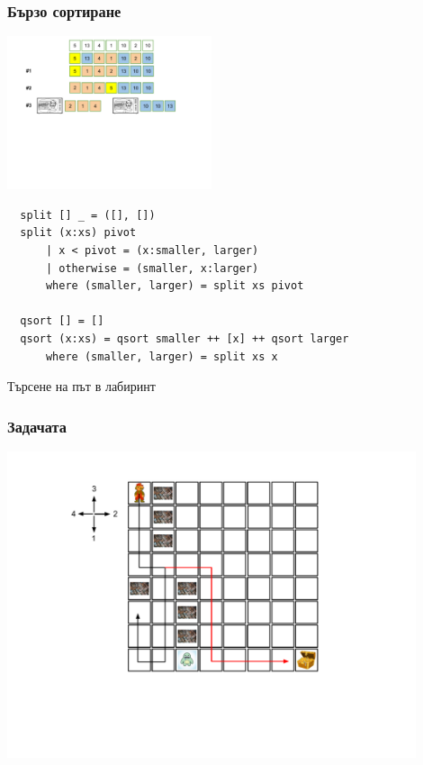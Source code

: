 \documentclass{beamer}
\begin{document}
\begin{frame}[fragile]
  \frametitle{Бързо сортиране}

  \begin{center}
    \includegraphics[width=6cm]{images/qsort}
 \end{center}
   
\vspace*{-2cm}

\begin{lstlisting}
  split [] _ = ([], [])
  split (x:xs) pivot 
      | x < pivot = (x:smaller, larger)
      | otherwise = (smaller, x:larger)
      where (smaller, larger) = split xs pivot
  
  qsort [] = []
  qsort (x:xs) = qsort smaller ++ [x] ++ qsort larger
      where (smaller, larger) = split xs x
  \end{lstlisting}
  

\end{frame}


\begin{frame}
  \centerline{Търсене на път в лабиринт}
\end{frame}



\begin{frame}[fragile]
  \frametitle{Задачата}
  \includegraphics[width=12cm]{images/lab_sol}
\end{frame}
\end{document}
